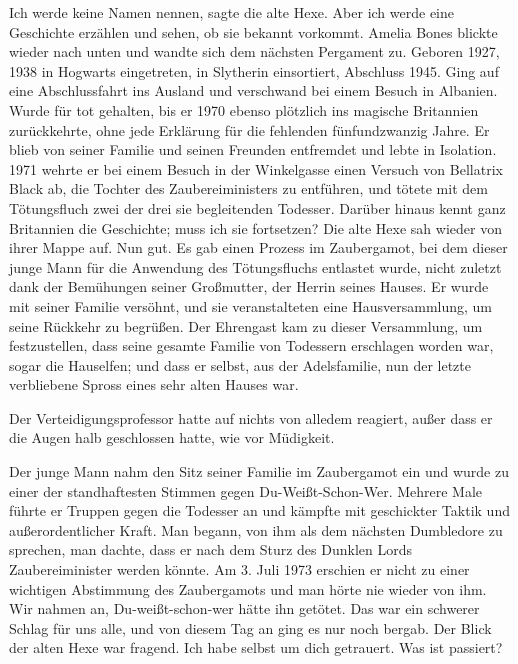 \glqq{}Ich werde keine Namen nennen\grqq{}, sagte die alte Hexe. \glqq{}Aber ich
werde eine Geschichte erzählen und sehen, ob sie bekannt vorkommt.\grqq{} Amelia
Bones blickte wieder nach unten und wandte sich dem nächsten Pergament zu. \glqq{}
Geboren 1927, 1938 in Hogwarts eingetreten, in Slytherin einsortiert, Abschluss
1945. Ging auf eine Abschlussfahrt ins Ausland und verschwand bei einem Besuch
in Albanien. Wurde für tot gehalten, bis er 1970 ebenso plötzlich ins magische
Britannien zurückkehrte, ohne jede Erklärung für die fehlenden fünfundzwanzig
Jahre. Er blieb von seiner Familie und seinen Freunden entfremdet und lebte in
Isolation. 1971 wehrte er bei einem Besuch in der Winkelgasse einen Versuch von
Bellatrix Black ab, die Tochter des Zaubereiministers zu entführen, und tötete
mit dem Tötungsfluch zwei der drei sie begleitenden Todesser. Darüber hinaus
kennt ganz Britannien die Geschichte; muss ich sie fortsetzen?\grqq{} Die alte
Hexe sah wieder von ihrer Mappe auf. \glqq{}Nun gut. Es gab einen Prozess im
Zaubergamot, bei dem dieser junge Mann für die Anwendung des Tötungsfluchs
entlastet wurde, nicht zuletzt dank der Bemühungen seiner Großmutter, der Herrin
seines Hauses. Er wurde mit seiner Familie versöhnt, und sie veranstalteten eine
Hausversammlung, um seine Rückkehr zu begrüßen. Der Ehrengast kam zu dieser
Versammlung, um festzustellen, dass seine gesamte Familie von Todessern
erschlagen worden war, sogar die Hauselfen; und dass er selbst, aus der
Adelsfamilie, nun der letzte verbliebene Spross eines sehr alten Hauses
war.\grqq{}

Der Verteidigungsprofessor hatte auf nichts von alledem reagiert, außer dass er
die Augen halb geschlossen hatte, wie vor Müdigkeit.

\glqq{}Der junge Mann nahm den Sitz seiner Familie im Zaubergamot ein und wurde
zu einer der standhaftesten Stimmen gegen Du-Weißt-Schon-Wer. Mehrere Male
führte er Truppen gegen die Todesser an und kämpfte mit geschickter Taktik und
außerordentlicher Kraft. Man begann, von ihm als dem nächsten Dumbledore zu
sprechen, man dachte, dass er nach dem Sturz des Dunklen Lords Zaubereiminister
werden könnte. Am 3. Juli 1973 erschien er nicht zu einer wichtigen Abstimmung
des Zaubergamots und man hörte nie wieder von ihm. Wir nahmen an,
Du-weißt-schon-wer hätte ihn getötet. Das war ein schwerer Schlag für uns alle,
und von diesem Tag an ging es nur noch bergab.\grqq{} Der Blick der alten Hexe
war fragend. \glqq{}Ich habe selbst um dich getrauert. Was ist passiert?\grqq{}

